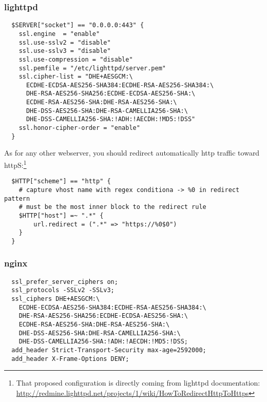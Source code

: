 \subsubsection{lighttpd}




\begin{verbatim}
  $SERVER["socket"] == "0.0.0.0:443" {
    ssl.engine  = "enable"
    ssl.use-sslv2 = "disable"
    ssl.use-sslv3 = "disable"
    ssl.use-compression = "disable"
    ssl.pemfile = "/etc/lighttpd/server.pem"
    ssl.cipher-list = "DHE+AESGCM:\
      ECDHE-ECDSA-AES256-SHA384:ECDHE-RSA-AES256-SHA384:\
      DHE-RSA-AES256-SHA256:ECDHE-ECDSA-AES256-SHA:\
      ECDHE-RSA-AES256-SHA:DHE-RSA-AES256-SHA:\
      DHE-DSS-AES256-SHA:DHE-RSA-CAMELLIA256-SHA:\
      DHE-DSS-CAMELLIA256-SHA:!ADH:!AECDH:!MD5:!DSS"
    ssl.honor-cipher-order = "enable"
  }
\end{verbatim}

As for any other webserver, you should redirect automatically http traffic toward httpS:\footnote{That proposed configuration is directly coming from lighttpd documentation: \url{http://redmine.lighttpd.net/projects/1/wiki/HowToRedirectHttpToHttps}}

\begin{verbatim}
  $HTTP["scheme"] == "http" {
    # capture vhost name with regex conditiona -> %0 in redirect pattern
    # must be the most inner block to the redirect rule
    $HTTP["host"] =~ ".*" {
        url.redirect = (".*" => "https://%0$0")
    }
  }
\end{verbatim}

\subsubsection{nginx}



\begin{verbatim}
  ssl_prefer_server_ciphers on;
  ssl_protocols -SSLv2 -SSLv3; 
  ssl_ciphers DHE+AESGCM:\
    ECDHE-ECDSA-AES256-SHA384:ECDHE-RSA-AES256-SHA384:\
    DHE-RSA-AES256-SHA256:ECDHE-ECDSA-AES256-SHA:\
    ECDHE-RSA-AES256-SHA:DHE-RSA-AES256-SHA:\
    DHE-DSS-AES256-SHA:DHE-RSA-CAMELLIA256-SHA:\
    DHE-DSS-CAMELLIA256-SHA:!ADH:!AECDH:!MD5:!DSS;
  add_header Strict-Transport-Security max-age=2592000;
  add_header X-Frame-Options DENY;
\end{verbatim}

